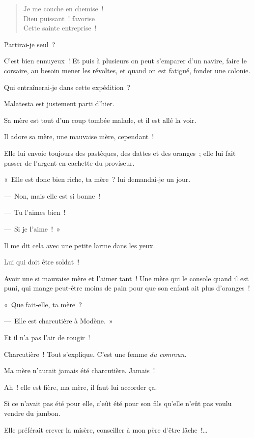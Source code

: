 \documentclass[french,twoside]{book} %
\begin{document}
\begin{verse}
Je me couche en chemise !\\
Dieu puissant ! favorise\\
Cette sainte entreprise !\\
\end{verse}

\noindent Partirai-je seul ?\par
C’est bien ennuyeux ! Et puis à plusieurs on peut s’emparer d’un navire, faire le corsaire, au besoin mener les révoltes, et quand on est fatigué, fonder une colonie.\par
Qui entraînerai-je dans cette expédition ?\par
Malatesta est justement parti d’hier.\par
Sa mère est tout d’un coup tombée malade, et il est allé la voir.\par
Il adore sa mère, une mauvaise mère, cependant !\par
Elle lui envoie toujours des pastèques, des dattes et des oranges ; elle lui fait passer de l’argent en cachette du proviseur.\par
« Elle est donc bien riche, ta mère ? lui demandai-je un jour.\par
— Non, mais elle est si bonne !\par
— Tu l’aimes bien !\par
— Si je l’aime ! »\par
Il me dit cela avec une petite larme dans les yeux.\par
Lui qui doit être soldat !\par
Avoir une si mauvaise mère et l’aimer tant ! Une mère qui le console quand il est puni, qui mange peut-être moins de pain pour que son enfant ait plus d’oranges !\par
« Que fait-elle, ta mère ?\par
— Elle est charcutière à Modène. »\par
Et il n’a pas l’air de rougir !\par
Charcutière ! Tout s’explique. C’est une femme \emph{du commun}.\par
Ma mère n’aurait jamais été charcutière. Jamais !\par
\bigbreak
\noindent Ah ! elle est fière, ma mère, il faut lui accorder ça.\par
Si ce n’avait pas été pour elle, c’eût été pour son fils qu’elle n’eût pas voulu vendre du jambon.\par
Elle préférait crever la misère, conseiller à mon père d’être lâche !…\par
\end{document}
